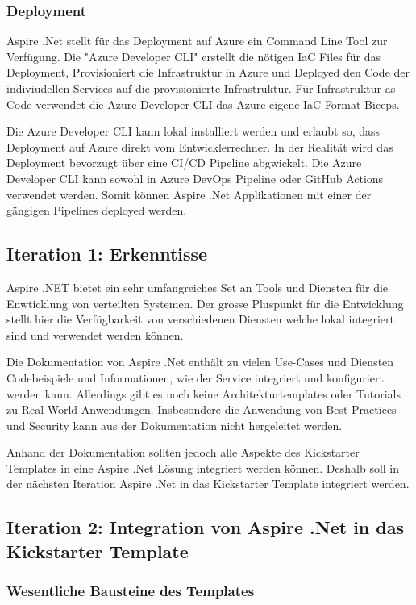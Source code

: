         \subsubsection{Deployment}
            Aspire .Net stellt für das Deployment auf Azure ein Command Line Tool zur Verfügung. Die "Azure Developer CLI" erstellt die nötigen IaC Files für das Deployment, Provisioniert die Infrastruktur in Azure und Deployed den Code der indiviudellen Services auf die provisionierte Infrastruktur. Für Infrastruktur as Code verwendet die Azure Developer CLI das Azure eigene IaC Format Biceps. 

            Die Azure Developer CLI kann lokal installiert werden und erlaubt so, dass Deployment auf Azure direkt vom Entwicklerrechner. In der Realität wird das Deployment bevorzugt über eine CI/CD Pipeline abgwickelt. Die Azure Developer CLI kann sowohl in Azure DevOps Pipeline oder GitHub Actions verwendet werden. Somit können Aspire .Net Applikationen mit einer der gängigen Pipelines deployed werden.

    \subsection{Iteration 1: Erkenntisse}
            Aspire .NET bietet ein sehr umfangreiches Set an Tools und Diensten für die Enwticklung von verteilten Systemen. Der grosse Pluspunkt für die Entwicklung stellt hier die Verfügbarkeit von verschiedenen Diensten welche lokal integriert sind und verwendet werden können.

            Die Dokumentation von Aspire .Net enthält zu vielen Use-Cases und Diensten Codebeispiele und Informationen, wie der Service integriert und konfiguriert werden kann. Allerdings gibt es noch keine Architekturtemplates oder Tutorials zu Real-World Anwendungen. Insbesondere die Anwendung von Best-Practices und Security kann aus der Dokumentation nicht hergeleitet werden.

            Anhand der Dokumentation sollten jedoch alle Aspekte des Kickstarter Templates in eine Aspire .Net Lösung integriert werden können. Deshalb soll in der nächsten Iteration Aspire .Net in das Kickstarter Template integriert werden.
            
    \subsection{Iteration 2: Integration von Aspire .Net in das Kickstarter Template}
        \subsubsection{Wesentliche Bausteine des Templates}


